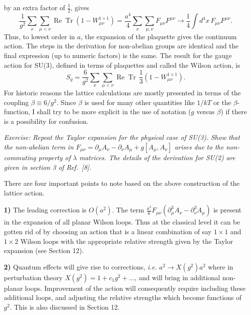 by an extra factor of $\frac{1}{2}$, gives
\[
\frac{1}{g^2}\sum_x\sum_{\mu<\nu}\operatorname{Re}\operatorname{Tr}(1-W_{\mu\nu}^{1\times1})
= \frac{a^4}{4}\sum_x\sum_{\mu,\nu}F_{\mu\nu}F^{\mu\nu}
\to \frac{1}{4}\int d^4x\, F_{\mu\nu}F^{\mu\nu} .
\]
Thus, to lowest order in $a$, the expansion of the plaquette gives the
continuum action. The steps in the derivation for non-abelian groups are
identical and the final expression (up to numeric factors) is the same. The
result for the gauge action for SU(3), defined in terms of plaquettes and
called the Wilson action, is
\begin{equation}
\label{eq:Wgaugeaction}
S_g = \frac{6}{g^2}\sum_x\sum_{\mu<\nu}\operatorname{Re}\operatorname{Tr}\,
      \frac{1}{3}(1-W_{\mu\nu}^{1\times1}) .
\end{equation}
For historic reasons the lattice calculations are mostly presented in terms
of the coupling $\beta \equiv 6/g^2$. Since $\beta$ is used for many other
quantities like $1/kT$ or the $\beta$-function, I shall try to be more
explicit in the use of notation ($g$ versus $\beta$) if there is a possibility
for confusion.

\medskip
\noindent\textit{Exercise: Repeat the Taylor expansion for the physical case
of SU(3). Show that the non-abelian term in $F_{\mu\nu} = \partial_\mu A_\nu -
\partial_\nu A_\mu + g[A_\mu, A_\nu]$ arises due to the non-commuting property
of $\lambda$ matrices. The details of the derivation for SU(2) are given in
section 3 of Ref.~[8].}
\medskip

There are four important points to note based on the above construction of
the lattice action.

\textbf{1)} The leading correction is $O(a^2)$. The term
$\frac{a^2}{6}F_{\mu\nu}(\partial_\mu^3 A_\nu - \partial_\nu^3 A_\mu)$ is
present in the expansion of all planar Wilson loops. Thus at the classical
level it can be gotten rid of by choosing an action that is a linear
combination of say $1\times1$ and $1\times2$ Wilson loops with the appropriate
relative strength given by the Taylor expansion (see Section 12).

\textbf{2)} Quantum effects will give rise to corrections, \textit{i.e.}
$a^2 \to X(g^2)a^2$ where in perturbation theory
$X(g^2) = 1 + c_1 g^2 + \ldots$, and will bring in additional non-planar
loops. Improvement of the action will consequently require including these
additional loops, and adjusting the relative strengths which become
functions of $g^2$. This is also discussed in Section 12.

